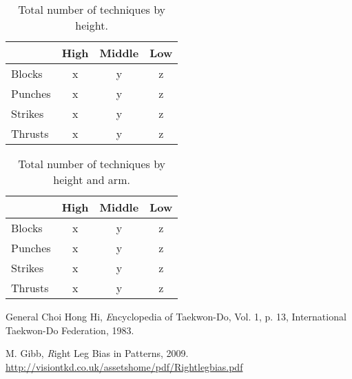 \documentclass[10pt,twocolumn,a4paper]{article}
\begin{document}
\begin{table}
  \centering
  \begin{tabular}{l|c|c|c} \hline \hline
    & High & Middle & Low \\ \hline

    Blocks    & x   & y   & z \\
    Punches   & x   & y   & z \\
    Strikes   & x   & y   & z \\
    Thrusts   & x   & y   & z \\
    \hline

  \end{tabular}
  \caption{Total number of techniques by height.}
  \end{table}


\begin{table}
  \centering
  \begin{tabular}{l|c|c|c} \hline \hline
    & High & Middle & Low \\ \hline

    Blocks    & x   & y   & z \\
    Punches   & x   & y   & z \\
    Strikes   & x   & y   & z \\
    Thrusts   & x   & y   & z \\
    \hline

  \end{tabular}
  \caption{Total number of techniques by height and arm.}
  \end{table}







\begin{thebibliography}{99}
    \small  %

      General Choi Hong Hi,
      {\emph Encyclopedia of Taekwon-Do}, Vol. 1, p. 13,
      International Taekwon-Do Federation, 1983.

      M. Gibb,
      {\emph Right Leg Bias in Patterns}, 2009.
      \url{http://visiontkd.co.uk/assetshome/pdf/Rightlegbias.pdf}













\end{thebibliography}
\end{document}
